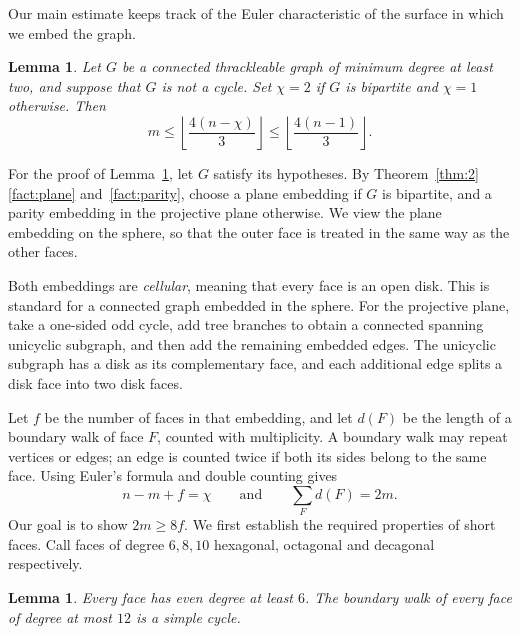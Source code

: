 \documentclass[11pt,a4paper]{article}
\newtheorem{lemma}[theorem]{Lemma}
\begin{document}
Our main estimate keeps track of the Euler characteristic of the
surface in which we embed the graph.

\begin{lemma}\label{lem:main}
Let $G$ be a connected thrackleable graph of minimum
degree at least two, and suppose that $G$ is not a cycle. Set $\chi=2$
if $G$ is bipartite and $\chi=1$ otherwise. Then
\[
 m\le\left\lfloor\frac{4(n-\chi)}3\right\rfloor
 \le\left\lfloor\frac{4(n-1)}3\right\rfloor.
\]
\end{lemma}

For the proof of Lemma~\ref{lem:main}, let $G$ satisfy its hypotheses. By Theorem~\ref{thm:2}\ref{fact:plane}
and~\ref{fact:parity}, choose a plane embedding if $G$ is bipartite,
and a parity embedding in the projective plane otherwise. We view the
plane embedding on the sphere, so that the outer face is treated in
the same way as the other faces.

Both embeddings are \emph{cellular}, meaning that every face is an open
disk. This is standard for a connected graph embedded in the sphere.
For the projective plane, take a one-sided odd cycle, add tree
branches to obtain a connected spanning unicyclic subgraph, and then add
the remaining embedded edges. The unicyclic subgraph has a disk as its
complementary face, and each additional edge splits a disk face into two
disk faces.

Let $f$ be the number of faces in that embedding, and let $d(F)$ be the
length of a boundary walk of face $F$, counted with multiplicity. A
boundary walk may repeat vertices or edges; an edge is counted twice
if both its sides belong to the same face. Using Euler's formula and
double counting gives
\begin{equation}\label{eq:euler}
 n-m+f=\chi
 \qquad\text{and}\qquad
 \sum_F d(F)=2m.
\end{equation}
Our goal is to show $2m\ge8f$. We first establish the required
properties of short faces. Call faces of degree $6,8,10$ hexagonal,
octagonal and decagonal respectively.

\begin{lemma}\label{lem:walks}
Every face has even degree at least $6$. The boundary walk of every face
of degree at most $12$ is a simple cycle.
\end{lemma}
\end{document}
